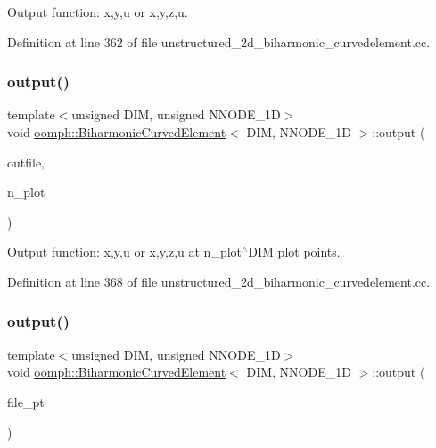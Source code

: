 Output function\+: x,y,u or x,y,z,u. 



Definition at line 362 of file unstructured\+\_\+2d\+\_\+biharmonic\+\_\+curvedelement.\+cc.

\mbox{\label{classoomph_1_1BiharmonicCurvedElement_ac6229a99465efed7ef1852806f12772e}} 
\subsubsection{\texorpdfstring{output()}{output()}\hspace{0.1cm}{\footnotesize\ttfamily [2/4]}}
{\footnotesize\ttfamily template$<$unsigned D\+IM, unsigned N\+N\+O\+D\+E\+\_\+1D$>$ \\
void \hyperlink{classoomph_1_1BiharmonicCurvedElement}{oomph\+::\+Biharmonic\+Curved\+Element}$<$ D\+IM, N\+N\+O\+D\+E\+\_\+1D $>$\+::output (\begin{DoxyParamCaption}\item[{std\+::ostream \&}]{outfile,  }\item[{const unsigned \&}]{n\+\_\+plot }\end{DoxyParamCaption})\hspace{0.3cm}{\ttfamily [inline]}}



Output function\+: x,y,u or x,y,z,u at n\+\_\+plot$^\wedge$\+D\+IM plot points. 



Definition at line 368 of file unstructured\+\_\+2d\+\_\+biharmonic\+\_\+curvedelement.\+cc.

\mbox{\label{classoomph_1_1BiharmonicCurvedElement_a6bb84710cab6c0c27c90e2b0675ff6cd}} 
\subsubsection{\texorpdfstring{output()}{output()}\hspace{0.1cm}{\footnotesize\ttfamily [3/4]}}
{\footnotesize\ttfamily template$<$unsigned D\+IM, unsigned N\+N\+O\+D\+E\+\_\+1D$>$ \\
void \hyperlink{classoomph_1_1BiharmonicCurvedElement}{oomph\+::\+Biharmonic\+Curved\+Element}$<$ D\+IM, N\+N\+O\+D\+E\+\_\+1D $>$\+::output (\begin{DoxyParamCaption}\item[{F\+I\+LE $\ast$}]{file\+\_\+pt }\end{DoxyParamCaption})\hspace{0.3cm}{\ttfamily [inline]}}



